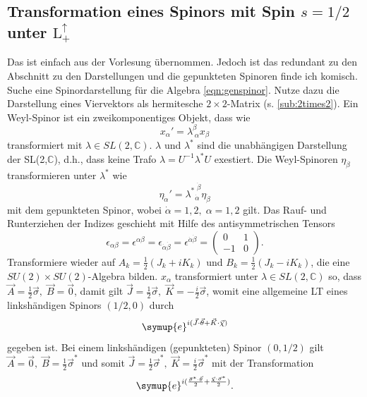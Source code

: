 \documentclass[
  captions=tableheading,  %
  titlepage=firstiscover, %
]{scrartcl}
\begin{document}
\subsection{Transformation eines Spinors mit Spin \texorpdfstring{$s = 1/2$}{PDFstring}
unter \texorpdfstring{$\text{L}_+^{\uparrow}$}{PDFstring}}
{\color{red} Das ist einfach aus der Vorlesung übernommen.
Jedoch ist das redundant zu den Abschnitt zu den Darstellungen und die gepunkteten Spinoren 
finde ich komisch.}
Suche eine Spinordarstellung für die Algebra \eqref{eqn:genspinor}.
Nutze dazu die Darstellung eines Viervektors als hermitesche $2\times 2$-Matrix (s. \ref{sub:2times2}).
Ein Weyl-Spinor ist ein zweikomponentiges Objekt, dass wie 
\begin{equation*}
  x_{\alpha}' = \lambda_{\; \alpha}^{\beta} x_{\beta}
\end{equation*}
transformiert mit $\lambda \in SL(2, \mathbb{C})$.
$\lambda$ und $\lambda^*$ sind die unabhängigen Darstellung der SL(2,$\mathbb{C}$), d.h., dass 
keine Trafo $\lambda = U^{-1} \lambda^* U$ exestiert.
Die Weyl-Spinoren $\eta_{\dot{\beta}}$ transformieren unter $\lambda^*$ wie 
\begin{equation*}
  \eta_{\dot{\alpha}}' =  {\lambda^{*}}_{ \!\! \dot{\alpha}}^{\; \dot{\beta}} \eta_{\dot{\beta}}
\end{equation*}
mit dem gepunkteten Spinor, wobei $\dot{\alpha} = 1,2, \; \alpha  = 1,2$ gilt.
Das Rauf- und Runterziehen der Indizes geschieht mit Hilfe des antisymmetrischen Tensors  
\begin{equation*}
  \epsilon_{\alpha \beta} = \epsilon^{\alpha \beta} = \epsilon_{\dot{\alpha} \dot{\beta}} =
  \epsilon^{\dot{\alpha} \dot{\beta}}  = 
  \begin{pmatrix}
    0 & 1 \\
    -1 & 0
  \end{pmatrix} .
\end{equation*}
Transformiere wieder auf $A_k = \frac{1}{2} (J_k + i K_k)$ und $B_k = \frac{1}{2} (J_k - i K_k)$, die eine 
$SU(2) \times SU(2)$-Algebra bilden.
$x_{\alpha}$ transformiert unter $\lambda \in SL(2, \mathbb{C})$ so, dass 
$\vec{A} = \frac{1}{2}\vec{\sigma}, \; \vec{B} = \vec{0}$, damit gilt 
$\vec{J} =\frac{1}{2}\vec{\sigma}, \; \vec{K} = -\frac{i}{2}\vec{\sigma}$, womit eine 
allgemeine LT eines linkshändigen Spinors $(1/2, 0)$ durch 
\begin{equation*}
  \symup{e}^{i(\vec{J}\cdot \vec{\theta} + \vec{K} \cdot \vec{\chi})}
\end{equation*}
gegeben ist.
Bei einem linkshändigen (gepunkteten) Spinor $(0, 1/2)$ gilt
$\vec{A} = \vec{0}, \; \vec{B} = \frac{1}{2}\vec{\sigma}^*$ und somit 
$\vec{J} =\frac{1}{2}\vec{\sigma}^*, \; \vec{K} = \frac{i}{2}\vec{\sigma}^*$ 
mit der Transformation 
\begin{equation*}
  \symup{e}^{i(\frac{\vec{\sigma}^* \cdot \vec{\theta}}{2} + \frac{\vec{\chi} \cdot \vec{\sigma}^*}{2})}.
\end{equation*}
\end{document}
